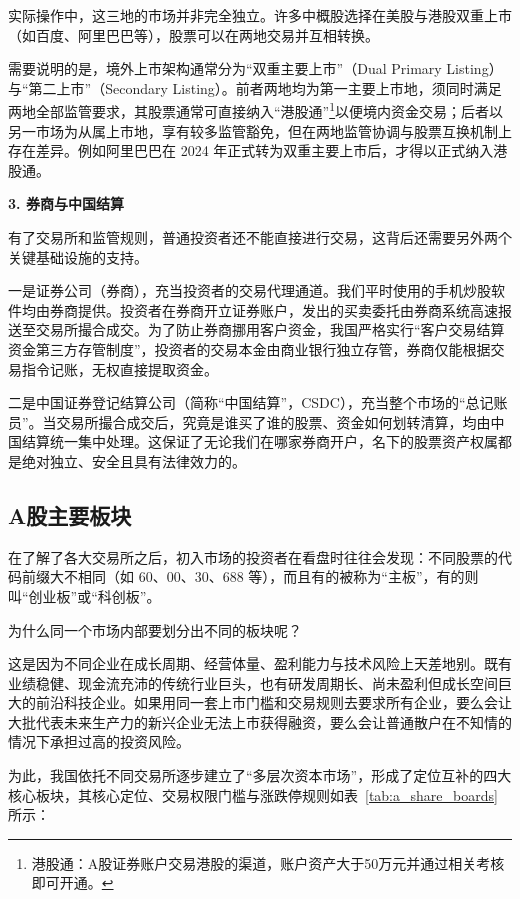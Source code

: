 \documentclass[12pt,openany]{book}
\newcommand{\subhead}[1]{%
    \par\vspace{0.5\baselineskip}%
    \noindent\textbf{#1}\par%
    \vspace{0.5\baselineskip}%
}
\begin{document}
实际操作中，这三地的市场并非完全独立。许多中概股选择在美股与港股双重上市（如百度、阿里巴巴等），股票可以在两地交易并互相转换。

需要说明的是，境外上市架构通常分为“双重主要上市”（Dual Primary Listing）与“第二上市”（Secondary Listing）。前者两地均为第一主要上市地，须同时满足两地全部监管要求，其股票通常可直接纳入“港股通”\footnote{港股通：A股证券账户交易港股的渠道，账户资产大于50万元并通过相关考核即可开通。}以便境内资金交易；后者以另一市场为从属上市地，享有较多监管豁免，但在两地监管协调与股票互换机制上存在差异。例如阿里巴巴在 2024 年正式转为双重主要上市后，才得以正式纳入港股通。

\subhead{3. 券商与中国结算}

有了交易所和监管规则，普通投资者还不能直接进行交易，这背后还需要另外两个关键基础设施的支持。

一是证券公司（券商），充当投资者的交易代理通道。我们平时使用的手机炒股软件均由券商提供。投资者在券商开立证券账户，发出的买卖委托由券商系统高速报送至交易所撮合成交。为了防止券商挪用客户资金，我国严格实行“客户交易结算资金第三方存管制度”，投资者的交易本金由商业银行独立存管，券商仅能根据交易指令记账，无权直接提取资金。

二是中国证券登记结算公司（简称“中国结算”，CSDC），充当整个市场的“总记账员”。当交易所撮合成交后，究竟是谁买了谁的股票、资金如何划转清算，均由中国结算统一集中处理。这保证了无论我们在哪家券商开户，名下的股票资产权属都是绝对独立、安全且具有法律效力的。

\subsection{A股主要板块}

在了解了各大交易所之后，初入市场的投资者在看盘时往往会发现：不同股票的代码前缀大不相同（如 60、00、30、688 等），而且有的被称为“主板”，有的则叫“创业板”或“科创板”。

为什么同一个市场内部要划分出不同的板块呢？

这是因为不同企业在成长周期、经营体量、盈利能力与技术风险上天差地别。既有业绩稳健、现金流充沛的传统行业巨头，也有研发周期长、尚未盈利但成长空间巨大的前沿科技企业。如果用同一套上市门槛和交易规则去要求所有企业，要么会让大批代表未来生产力的新兴企业无法上市获得融资，要么会让普通散户在不知情的情况下承担过高的投资风险。

为此，我国依托不同交易所逐步建立了“多层次资本市场”，形成了定位互补的四大核心板块，其核心定位、交易权限门槛与涨跌停规则如表~\ref{tab:a_share_boards} 所示：
\end{document}
